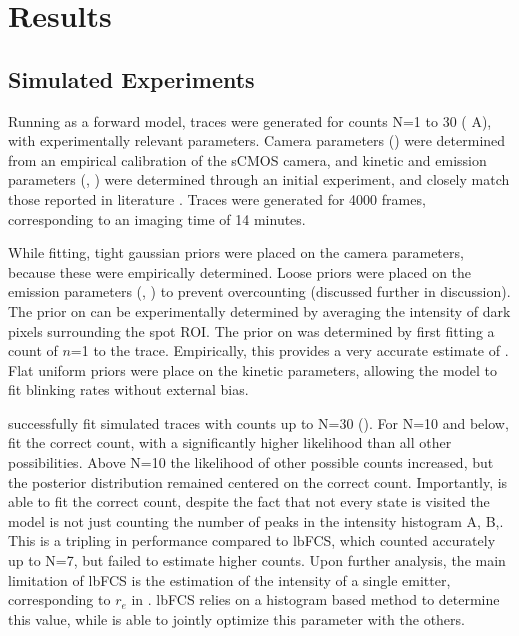 \section{Results}

\subsection{Simulated Experiments}
Running \ours as a forward model, traces were generated for counts N=1 to 30
	( A), with experimentally relevant parameters. 
	Camera parameters (\parametersc) were determined from an empirical calibration of the
	sCMOS camera, and kinetic and emission parameters (\parameterst, \parameterse) were determined through an
	initial experiment, and closely match those reported in literature \cite{stein_2021}.
	Traces were generated for 4000 frames, corresponding to an imaging time of 14 minutes.

While fitting, tight gaussian priors were placed on the camera parameters, because these were empirically determined.
	Loose priors were placed on the emission parameters (\rb, \re) to prevent overcounting (discussed further in discussion). 
	The prior on \rb can be experimentally determined by averaging the intensity of dark pixels surrounding the spot ROI.
	The prior on \re was determined by first fitting a count of $n$=1 to the trace. 
	Empirically, this provides a very accurate estimate of \re.
	Flat uniform priors were place on the kinetic parameters, allowing the model to fit blinking rates without external bias.

\ours successfully fit simulated traces with counts up to N=30 ().
	For N=10 and below, \ours fit the correct count, with a significantly higher likelihood than all other possibilities. 
	Above N=10 the likelihood of other possible counts increased, but the posterior distribution remained centered on the correct count.
	Importantly, \ours is able to fit the correct count,
	despite the fact that not every state is visited \ie the model is not just counting the number of peaks in the intensity histogram  A, B,.
	This is a tripling in performance compared to lbFCS, which counted accurately up to N=7, but failed to estimate higher counts.
	Upon further analysis, the main limitation of lbFCS is the estimation of the intensity of a single emitter, corresponding to $r_e$ in \ours. 
	lbFCS relies on a histogram based method to determine this value, while \ours is able to jointly optimize this parameter with the others.

